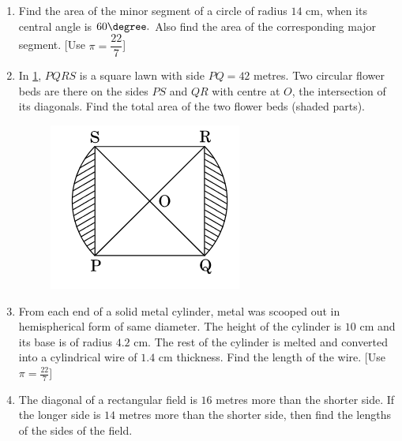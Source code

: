 \begin{enumerate}
\item Find the area of the minor segment of a circle of radius $14$ cm, when its central angle is $60 \degree.$ Also find the area of the corresponding major segment. [Use $\pi =\dfrac{22}{7}$]
\item In \ref{Figure 5}, $PQRS$ is a square lawn with side $PQ = 42$ metres. Two circular flower beds are there on the sides $PS$ and $QR$ with centre at $O$, the intersection of its diagonals. Find the total area of the two flower beds (shaded parts).
 \begin{figure}[h!]
	\centering
    \includegraphics[width=\columnwidth]{figs/cbse_30_3_5.png}
	\label{Figure 5}
\end{figure}
\item From each end of a solid metal cylinder, metal was scooped out in hemispherical form of same diameter. The height of the cylinder is $10$ cm and its base is of radius $4.2$ cm. The rest of the cylinder is melted and converted into a cylindrical wire of $1.4$ cm thickness. Find the length of the wire. [Use $ \pi=\frac{22}{7} $]
\item The diagonal of a rectangular field is $16$ metres more than the shorter side. If the longer side is $14$ metres more than the shorter side, then find the lengths of the sides of the field.

\end{enumerate}
